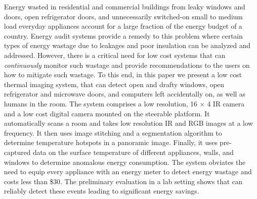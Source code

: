 Energy wasted in residential and commercial buildings from leaky windows and doors, open refrigerator doors, and unnecessarily switched-on small to medium load everyday appliances account for a large fraction of the energy budget of a country. Energy audit systems provide a remedy to this problem where certain types of energy wastage due to leakages and poor insulation can be analyzed and addressed. However, there is a critical need for low cost systems that can {\em continuously} monitor such wastage and provide recommendations to the users on how to mitigate such wastage. To this end, in this paper we present a low cost thermal imaging system, {\IRLeak} that can detect open and drafty windows, open refrigerator and microwave doors, and computers left accidentally on, as well as humans in the room. The system comprises a low resolution, 16 $\times$ 4 IR camera and a low cost digital camera mounted on the steerable platform. It automatically scans a room and takes low resolution IR and RGB images at a low frequency. It then uses image stitching and a segmentation algorithm to determine temperature hotspots in a panoramic image. Finally, it uses pre-captured data on the surface temperature of different appliances, walls, and windows to determine anomalous energy consumption. The system obviates the need to equip every appliance with an energy meter to detect energy wastage and costs less than \$30. The preliminary evaluation in a lab setting shows that {\IRLeak} can reliably detect these events leading to significant energy savings.

